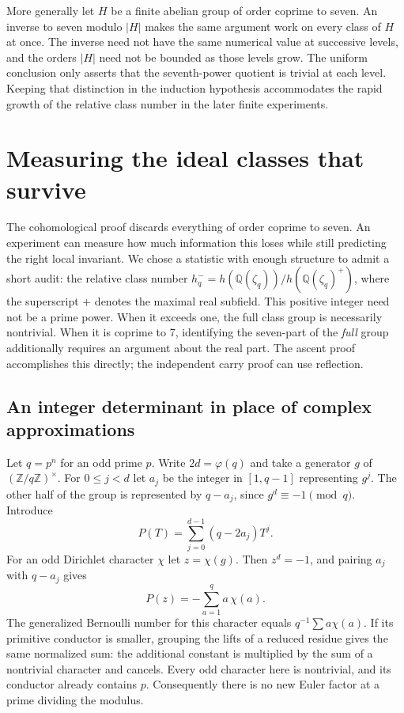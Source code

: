 \documentclass[12pt,letterpaper]{article}
\begin{document}
More generally let \(H\) be a finite abelian group of order coprime to seven. An inverse to seven modulo \(|H|\) makes the same argument work on every class of \(H\) at once. The inverse need not have the same numerical value at successive levels, and the orders \(|H|\) need not be bounded as those levels grow. The uniform conclusion only asserts that the seventh-power quotient is trivial at each level. Keeping that distinction in the induction hypothesis accommodates the rapid growth of the relative class number in the later finite experiments.



\section{Measuring the ideal classes that survive}
\label{sec:finite}
The cohomological proof discards everything of order coprime to seven. An experiment can measure how much information this loses while still predicting the right local invariant. We chose a statistic with enough structure to admit a short audit: the relative class number \(h^-_q=h(\mathbb Q(\zeta_q))/h(\mathbb Q(\zeta_q)^+)\), where the superscript \(+\) denotes the maximal real subfield. This positive integer need not be a prime power. When it exceeds one, the full class group is necessarily nontrivial. When it is coprime to 7, identifying the seven-part of the \emph{full} group additionally requires an argument about the real part. The ascent proof accomplishes this directly; the independent carry proof can use reflection.

\subsection{An integer determinant in place of complex approximations}
Let \(q=p^n\) for an odd prime \(p\). Write \(2d=\varphi(q)\) and take a generator \(g\) of \((\mathbb Z/q\mathbb Z)^\times\). For \(0\le j< d\) let \(a_j\) be the integer in \([1,q-1]\) representing \(g^j\). The other half of the group is represented by \(q-a_j\), since \(g^d\equiv-1\pmod q\). Introduce
\[
        P(T)=\sum_{j=0}^{d-1}(q-2a_j) T^j.
\]
For an odd Dirichlet character \(\chi\) let \(z=\chi(g)\). Then \(z^d=-1\), and pairing \(a_j\) with \(q-a_j\) gives
\[
         P(z)=-\sum_{a=1}^q a\,\chi(a).
\]
The generalized Bernoulli number for this character equals \(q^{-1}\sum a\chi(a)\). If its primitive conductor is smaller, grouping the lifts of a reduced residue gives the same normalized sum: the additional constant is multiplied by the sum of a nontrivial character and cancels. Every odd character here is nontrivial, and its conductor already contains \(p\). Consequently there is no new Euler factor at a prime dividing the modulus.
\end{document}
